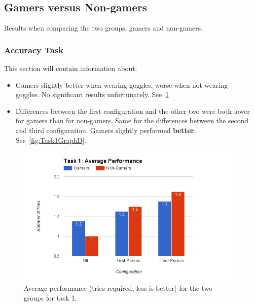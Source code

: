 \documentclass[runningheads,a4paper,oribibl]{llncs}
\begin{document}
\subsection{Gamers versus Non-gamers}
Results when comparing the two groups, gamers and non-gamers.
\subsubsection{Accuracy Task}
This section will contain information about:
\begin{itemize}
	\item Gamers slightly better when wearing goggles, worse when not wearing goggles. No significant results unfortunately. See~\ref{fig:Task1GraphP}
	\item Differences between the first configuration and the other two were both lower for gamers than for non-gamers. Same for the differences between the second and third configuration. Gamers slightly performed \textbf{better}. See~\ref{fig:Task1GraphD}.
\end{itemize}

\begin{figure}
   \centering
   \includegraphics[width=\textwidth]{ExternalMaterial/Task1GraphP}
   \caption{Average performance (tries required, less is better) for the two groups for task 1.} \label{fig:Task1GraphP}
\end{figure}
\end{document}
